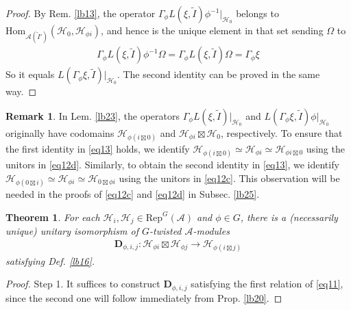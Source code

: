 \documentclass[11pt,b5paper,notitlepage]{article}
\theoremstyle{definition}
\newtheorem{rem}[df]{Remark}
\theoremstyle{plain}
\newtheorem{thm}[df]{Theorem}
\newcommand{\wtd}{\widetilde}
\newcommand{\Hom}{\mathrm{Hom}}
\newcommand{\RepGA}{\mathrm{Rep}^G(\mathcal A)}
\newcommand{\mbf}{\mathbf}
\newcommand{\MA}{\mathcal A}
\newcommand{\MH}{\mathcal H}
\numberwithin{equation}{section}
\begin{document}
\begin{appendices}
\begin{proof}
By Rem. \ref{lb13}, the operator $\Gamma_\phi L(\xi,\wtd I)\phi^{-1}|_{\MH_0}$ belongs to $\Hom_{\MA(\wtd I')}(\MH_0,\MH_{\phi i})$, and hence is the unique element in that set sending $\Omega$ to
\begin{align*}
\Gamma_\phi L(\xi,\wtd I)\phi^{-1}\Omega=\Gamma_\phi L(\xi,\wtd I)\Omega=\Gamma_\phi\xi
\end{align*}
So it equals $L(\Gamma_\phi\xi,\wtd I)|_{\MH_0}$. The second identity can be proved in the same way.
\end{proof}

\begin{rem}\label{lb27}
In Lem. \ref{lb23}, the operators $\Gamma_\phi L(\xi,\wtd I)\big|_{\MH_0}$ and $L(\Gamma_\phi\xi,\wtd I)\phi\big|_{\MH_0}$ originally have codomains $\MH_{\phi(i\boxtimes 0)}$ and $\MH_{\phi i}\boxtimes\MH_0$, respectively. To ensure that the first identity in \eqref{eq13} holds, we identify $\MH_{\phi(i\boxtimes 0)}\simeq\MH_{\phi i}\simeq\MH_{\phi i\boxtimes0}$ using the unitors in \eqref{eq12d}. Similarly, to obtain the second identity in \eqref{eq13}, we identify $\MH_{\phi(0\boxtimes i)}\simeq\MH_{\phi i}\simeq\MH_{0\boxtimes\phi i}$ using the unitors in \eqref{eq12c}. This observation will be needed in the proofs of \eqref{eq12c} and \eqref{eq12d} in Subsec. \ref{lb25}.
\end{rem}



\begin{thm}\label{lb28}
For each $\MH_i,\MH_j\in\RepGA$ and $\phi\in G$, there is a (necessarily unique) unitary isomorphism of $G$-twisted $\MA$-modules
\begin{align*}
\mbf D_{\phi,i,j}:\MH_{\phi i}\boxtimes\MH_{\phi j}\rightarrow \MH_{\phi(i\boxtimes j)}
\end{align*}
satisfying Def. \ref{lb16}.
\end{thm}

\begin{proof}
Step 1. It suffices to construct $\mbf D_{\phi,i,j}$ satisfying the first relation of \eqref{eq11}, since the second one will follow immediately from Prop. \ref{lb20}.  


\end{proof}
\end{appendices}
\end{document}
